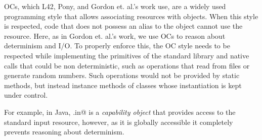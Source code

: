 OCs, which L42, Pony, and Gordon et. al.'s work use, are a widely used~\cite{miller2003capability,
noble2016abstract,karger1988improving} programming style that allows associating resources with objects. When this style
is respected, code that does not possess an alias to the object cannot use the resource.
Here, as in Gordon et. al.'s work, we use OCs to reason about determinism and I/O. To properly enforce this, the OC style needs to be respected while implementing the primitives of the standard library and native calls that could be non deterministic, such as operations that read from files or generate random numbers. Such operations would not be provided by static methods, but instead instance methods of classes whose instantiation is kept under control. 




\lstset{language=Java}
 For example, in Java, \Q@System.in@
 \lstset{language=FortyTwo} 
  is a \emph{capability object} that provides access to the standard input resource, however, as it is globally accessible it completely prevents reasoning about determinism. 

